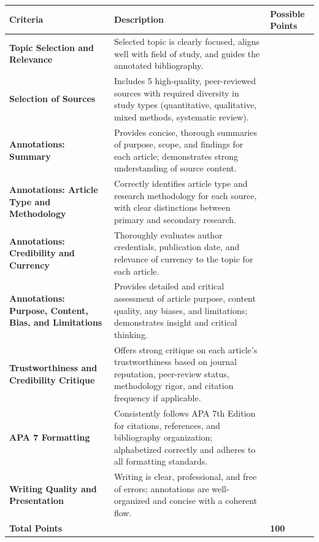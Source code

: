 \documentclass[
  letterpaper,
  DIV=11,
  numbers=noendperiod]{scrreprt}
\begin{document}
\begin{longtable}[]{@{}
  >{\raggedright\arraybackslash}p{}
  >{\raggedright\arraybackslash}p{}
  >{\raggedright\arraybackslash}p{}@{}}
\toprule\noalign{}
\begin{minipage}[b]{\linewidth}\raggedright
\textbf{Criteria}
\end{minipage} & \begin{minipage}[b]{\linewidth}\raggedright
\textbf{Description}
\end{minipage} & \begin{minipage}[b]{\linewidth}\raggedright
\textbf{Possible Points}
\end{minipage} \\
\midrule\noalign{}
\endhead
\bottomrule\noalign{}
\endlastfoot
\textbf{Topic Selection and Relevance} & Selected topic is clearly
focused, aligns well with field of study, and guides the annotated
bibliography. & 5 \\
\textbf{Selection of Sources} & Includes 5 high-quality, peer-reviewed
sources with required diversity in study types (quantitative,
qualitative, mixed methods, systematic review). & 10 \\
\textbf{Annotations: Summary} & Provides concise, thorough summaries of
purpose, scope, and findings for each article; demonstrates strong
understanding of source content. & 20 \\
\textbf{Annotations: Article Type and Methodology} & Correctly
identifies article type and research methodology for each source, with
clear distinctions between primary and secondary research. & 10 \\
\textbf{Annotations: Credibility and Currency} & Thoroughly evaluates
author credentials, publication date, and relevance of currency to the
topic for each article. & 10 \\
\textbf{Annotations: Purpose, Content, Bias, and Limitations} & Provides
detailed and critical assessment of article purpose, content quality,
any biases, and limitations; demonstrates insight and critical thinking.
& 15 \\
\textbf{Trustworthiness and Credibility Critique} & Offers strong
critique on each article's trustworthiness based on journal reputation,
peer-review status, methodology rigor, and citation frequency if
applicable. & 15 \\
\textbf{APA 7 Formatting} & Consistently follows APA 7th Edition for
citations, references, and bibliography organization; alphabetized
correctly and adheres to all formatting standards. & 5 \\
\textbf{Writing Quality and Presentation} & Writing is clear,
professional, and free of errors; annotations are well-organized and
concise with a coherent flow. & 10 \\
\textbf{Total Points} & & \textbf{100} \\
\end{longtable}
\end{document}
